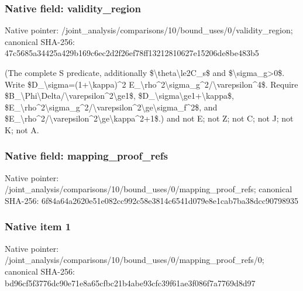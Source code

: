 \documentclass[10pt,a4paper]{article}
\begin{document}
\subsubsection{Native field: validity\_region}


Native pointer: /joint\_analysis/comparis\allowbreak{}ons/10/bound\_uses/0/vali\allowbreak{}dity\_region; canonical SHA-256: 47c5685a34425a429b169c6e\allowbreak{}c2d2f26ef78ff13212810627\allowbreak{}e15206de8be483b5


(The complete S predicate, additionally \$\textbackslash{}theta\textbackslash{}le2C\_s\$ and \$\textbackslash{}sigma\_g>0\$. Write \$D\_\textbackslash{}sigma=(1+\textbackslash{}kappa)\textasciicircum{}2 E\_\textbackslash{}rho\textasciicircum{}2\textbackslash{}sigma\_g\textasciicircum{}2/\textbackslash{}varepsilon\textasciicircum{}4\$. Require \$B\_\textbackslash{}Phi\textbackslash{}Delta/\textbackslash{}varepsilon\textasciicircum{}2\textbackslash{}ge1\$, \$D\_\textbackslash{}sigma\textbackslash{}ge1+\textbackslash{}kappa\$, \$E\_\textbackslash{}rho\textasciicircum{}2\textbackslash{}sigma\_g\textasciicircum{}2/\textbackslash{}var\allowbreak{}epsilon\textasciicircum{}2\textbackslash{}ge\textbackslash{}sigma\_f\textasciicircum{}2\$, and \$E\_\textbackslash{}rho\textasciicircum{}2/\textbackslash{}varepsilon\textasciicircum{}2\textbackslash{}ge\textbackslash{}kappa\textasciicircum{}2+1\$.) and not E; not Z; not C; not J; not K; not A.


\subsubsection{Native field: mapping\_proof\_refs}


Native pointer: /joint\_analysis/comparis\allowbreak{}ons/10/bound\_uses/0/mapp\allowbreak{}ing\_proof\_refs; canonical SHA-256: 6f84a64a2620e51e082cc992\allowbreak{}c58e3814c6541d079e8e1cab\allowbreak{}7ba38dcc90798935



\subsubsection{Native item 1}


Native pointer: /joint\_analysis/comparis\allowbreak{}ons/10/bound\_uses/0/mapp\allowbreak{}ing\_proof\_refs/0; canonical SHA-256: bd96cf5f3776dc90e71e8a65\allowbreak{}cfbc21b4abe93cfc39f61ae3\allowbreak{}f086f7a7769d8d97
\end{document}
